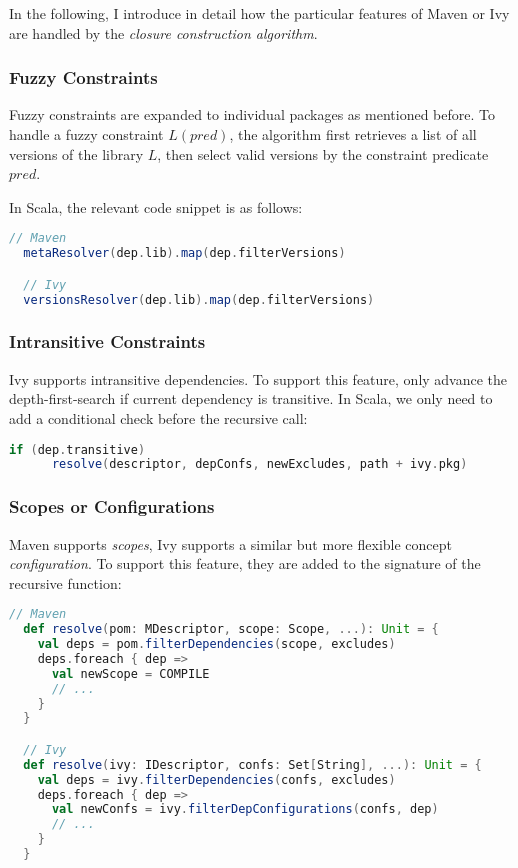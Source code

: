 In the following, I introduce in detail how the particular features of Maven or Ivy are handled by the \emph{closure construction algorithm}.

\subsubsection{Fuzzy Constraints}

Fuzzy constraints are expanded to individual packages as mentioned before. To handle a fuzzy constraint $L(pred)$, the algorithm first retrieves a list of all versions of the library $L$, then select valid versions by the constraint predicate $pred$.

In Scala, the relevant code snippet is as follows:

\begin{lstlisting}[language=Scala]
  // Maven
  metaResolver(dep.lib).map(dep.filterVersions)

  // Ivy
  versionsResolver(dep.lib).map(dep.filterVersions)
\end{lstlisting}

\subsubsection{Intransitive Constraints}

Ivy supports intransitive dependencies. To support this feature, only advance the depth-first-search if current dependency is transitive. In Scala, we only need to add a conditional check before the recursive call:

\begin{lstlisting}[language=Scala]
  if (dep.transitive)
      resolve(descriptor, depConfs, newExcludes, path + ivy.pkg)
\end{lstlisting}

\subsubsection{Scopes or Configurations}

Maven supports \emph{scopes}, Ivy supports a similar but more flexible concept \emph{configuration}. To support this feature, they are added to the signature of the recursive function:

\begin{lstlisting}[language=Scala]
  // Maven
  def resolve(pom: MDescriptor, scope: Scope, ...): Unit = {
    val deps = pom.filterDependencies(scope, excludes)
    deps.foreach { dep =>
      val newScope = COMPILE
      // ...
    }
  }

  // Ivy
  def resolve(ivy: IDescriptor, confs: Set[String], ...): Unit = {
    val deps = ivy.filterDependencies(confs, excludes)
    deps.foreach { dep =>
      val newConfs = ivy.filterDepConfigurations(confs, dep)
      // ...
    }
  }
\end{lstlisting}

